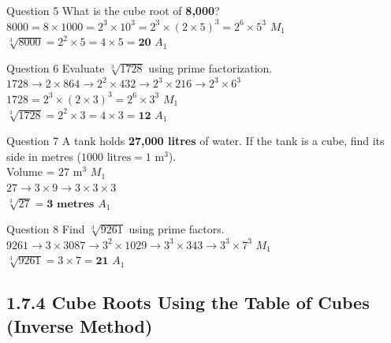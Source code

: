 \documentclass[12pt, a4paper, oneside]{article}
\begin{document}
\begin{solvingbox}{Question 5}
What is the cube root of \textbf{8,000}? \\
$8000 = 8 \times 1000 = 2^3 \times 10^3 = 2^3 \times (2 \times 5)^3 = 2^6 \times 5^3$ \hfill $M_1$ \\
$\sqrt[3]{8000} = 2^2 \times 5 = 4 \times 5 = \mathbf{20}$ \hfill $A_1$
\end{solvingbox}

\begin{solvingbox}{Question 6}
Evaluate $\sqrt[3]{1728}$ using prime factorization. \\
$1728 \rightarrow 2 \times 864 \rightarrow 2^2 \times 432 \rightarrow 2^3 \times 216 \rightarrow 2^3 \times 6^3$ \\
$1728 = 2^3 \times (2 \times 3)^3 = 2^6 \times 3^3$ \hfill $M_1$ \\
$\sqrt[3]{1728} = 2^2 \times 3 = 4 \times 3 = \mathbf{12}$ \hfill $A_1$
\end{solvingbox}

\begin{solvingbox}{Question 7}
A tank holds \textbf{27,000 litres} of water. If the tank is a cube, find its side in metres ($1000\text{ litres} = 1\text{ m}^3$). \\
Volume = $27\text{ m}^3$ \hfill $M_1$ \\
$27 \rightarrow 3 \times 9 \rightarrow 3 \times 3 \times 3$ \\
$\sqrt[3]{27} = \mathbf{3\text{ metres}}$ \hfill $A_1$
\end{solvingbox}

\begin{solvingbox}{Question 8}
Find $\sqrt[3]{9261}$ using prime factors. \\
$9261 \rightarrow 3 \times 3087 \rightarrow 3^2 \times 1029 \rightarrow 3^3 \times 343 \rightarrow 3^3 \times 7^3$ \hfill $M_1$ \\
$\sqrt[3]{9261} = 3 \times 7 = \mathbf{21}$ \hfill $A_1$
\end{solvingbox}

\subsection*{1.7.4 Cube Roots Using the Table of Cubes (Inverse Method)}
\end{document}
